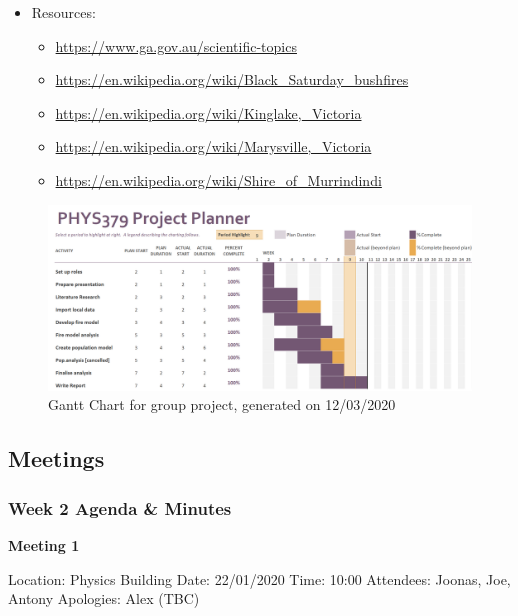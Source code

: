 \begin{itemize}
\begin{itemize}
\begin{itemize}
        \end{itemize}
    \end{itemize}
    \item Resources:
    \begin{itemize}
        \item \url{https://www.ga.gov.au/scientific-topics}
        \item \url{https://en.wikipedia.org/wiki/Black_Saturday_bushfires}
        \item \url{https://en.wikipedia.org/wiki/Kinglake,_Victoria}
        \item \url{https://en.wikipedia.org/wiki/Marysville,_Victoria}
        \item \url{https://en.wikipedia.org/wiki/Shire_of_Murrindindi}
    \end{itemize}
\end{itemize}

\begin{figure}[H]\label{ganttchart}
\centering
\includegraphics[width=\textwidth]{Figures/gantt_chart.png}\caption{Gantt Chart for group project, generated on 12/03/2020}
\end{figure}

\subsection{Meetings}

\subsubsection*{Week 2 Agenda \& Minutes}

\textbf{Meeting 1}

\noindent Location: Physics Building\newline
Date: 22/01/2020\newline
Time: 10:00\newline
Attendees: Joonas, Joe, Antony\newline
Apologies: Alex (TBC) 

